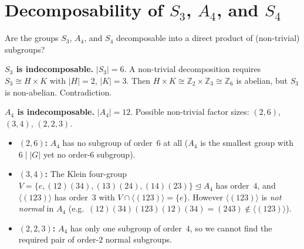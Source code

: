 \documentclass[12pt,a4paper]{article}
\newenvironment{problem}{\begin{mdframed}[style=problemstyle]}{\end{mdframed}}
\newenvironment{sol}{\begin{mdframed}[style=solstyle]}{\end{mdframed}}
\newcommand{\Z}{\mathbb{Z}}
\newcommand{\gen}[1]{\langle #1 \rangle}
\newcommand{\normal}{\trianglelefteq}
\begin{document}
\bigskip
\section{Decomposability of $S_3$, $A_4$, and $S_4$}

\begin{problem}
Are the groups $S_{3}$, $A_{4}$, and $S_{4}$ decomposable into a direct product
of (non-trivial) subgroups?
\end{problem}

\begin{sol}
\textbf{\color{SectCol}$S_3$ is indecomposable.}\;
$|S_3| = 6$. A non-trivial decomposition requires $S_3 \cong H \times K$ with
$|H|=2$, $|K|=3$. Then $H \times K \cong \Z_2 \times \Z_3 \cong \Z_6$ is
abelian, but $S_3$ is non-abelian. Contradiction.

\medskip
\textbf{\color{SectCol}$A_4$ is indecomposable.}\;
$|A_4|=12$. Possible non-trivial factor sizes: $(2,6)$, $(3,4)$, $(2,2,3)$.

\begin{itemize}[leftmargin=*]
  \item \textbf{$(2,6)$:} $A_4$ has no subgroup of order~$6$ at all
    ($A_4$ is the smallest group with $6 \mid |G|$ yet no order-$6$ subgroup).

  \item \textbf{$(3,4)$:} The Klein four-group
    $V = \{e, (12)(34), (13)(24), (14)(23)\} \normal A_4$
    has order~$4$, and $\gen{(123)}$ has order~$3$ with
    $V \cap \gen{(123)} = \{e\}$. However $\gen{(123)}$ is
    \emph{not normal} in $A_4$ (e.g.\
    $(12)(34)(123)(12)(34) = (243) \notin \gen{(123)}$).

  \item \textbf{$(2,2,3)$:} $A_4$ has only one subgroup of order~$4$,
    so we cannot find the required pair of order-$2$ normal subgroups.
\end{itemize}

\begin{center}
\end{center}


\end{sol}
\end{document}
